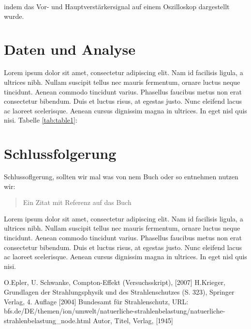 \documentclass[aps,twocolumn,secnumarabic,nobalancelastpage,amsmath,amssymb,
nofootinbib,superscriptaddress]{revtex4-1}
\begin{document}
indem das Vor- und Hauptverstärkersignal auf einem Oszilloskop dargestellt wurde.


\section{Daten und Analyse}

Lorem ipsum dolor sit amet, consectetur adipiscing elit. Nam id facilisis ligula,
a ultrices nibh. Nullam suscipit tellus nec mauris fermentum, ornare luctus neque
tincidunt. Aenean commodo tincidunt varius. Phasellus faucibus metus non erat
consectetur bibendum. Duis et luctus risus, at egestas justo. Nunc eleifend lacus
ac laoreet scelerisque. Aenean cursus dignissim magna in ultrices. In eget nisl
quis nisi. Tabelle \ref{tab:table1}:







\section{Schlussfolgerung}

Schlussoflgerung, sollten wir mal was von nem Buch oder so entnehmen nutzen wir:


\begin{quote}
  Ein Zitat mit Referenz auf das Buch\cite{melissinos1966}
\end{quote}

Lorem ipsum dolor sit amet, consectetur adipiscing elit. Nam id facilisis ligula,
a ultrices nibh. Nullam suscipit tellus nec mauris fermentum, ornare luctus neque
tincidunt. Aenean commodo tincidunt varius. Phasellus faucibus metus non erat
consectetur bibendum. Duis et luctus risus, at egestas justo. Nunc eleifend lacus
ac laoreet scelerisque. Aenean cursus dignissim magna in ultrices. In eget nisl
quis nisi.




\begin{thebibliography}{99}
O.Epler, U. Schwanke, Compton-Effekt (Versuchsskript),  [2007]
H.Krieger, Grundlagen der Strahlungsphysik und des Strahlenschutzes (S. 323), Springer Verlag, 4. Auflage [2004]
Bundesamt für Strahlenschutz, URL: bfs.de/DE/themen/ion/umwelt/natuerliche-strahlenbelastung/natuerliche-strahlenbelastung_node.html
Autor, Titel, Verlag,  [1945]
\end{thebibliography}
\end{document}
